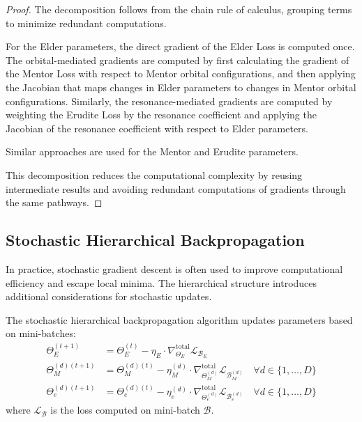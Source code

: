 \begin{proof}
The decomposition follows from the chain rule of calculus, grouping terms to minimize redundant computations.

For the Elder parameters, the direct gradient of the Elder Loss is computed once. The orbital-mediated gradients are computed by first calculating the gradient of the Mentor Loss with respect to Mentor orbital configurations, and then applying the Jacobian that maps changes in Elder parameters to changes in Mentor orbital configurations. Similarly, the resonance-mediated gradients are computed by weighting the Erudite Loss by the resonance coefficient and applying the Jacobian of the resonance coefficient with respect to Elder parameters.

Similar approaches are used for the Mentor and Erudite parameters.

This decomposition reduces the computational complexity by reusing intermediate results and avoiding redundant computations of gradients through the same pathways.
\end{proof}

\subsection{Stochastic Hierarchical Backpropagation}

In practice, stochastic gradient descent is often used to improve computational efficiency and escape local minima. The hierarchical structure introduces additional considerations for stochastic updates.

\begin{definition}
The stochastic hierarchical backpropagation algorithm updates parameters based on mini-batches:
\begin{align}
\Theta_E^{(t+1)} &= \Theta_E^{(t)} - \eta_E \cdot \nabla_{\Theta_E}^{\text{total}} \mathcal{L}_{\mathcal{B}_E} \\
\Theta_M^{(d)(t+1)} &= \Theta_M^{(d)(t)} - \eta_M^{(d)} \cdot \nabla_{\Theta_M^{(d)}}^{\text{total}} \mathcal{L}_{\mathcal{B}_M^{(d)}} \quad \forall d \in \{1, \ldots, D\} \\
\Theta_e^{(d)(t+1)} &= \Theta_e^{(d)(t)} - \eta_e^{(d)} \cdot \nabla_{\Theta_e^{(d)}}^{\text{total}} \mathcal{L}_{\mathcal{B}_e^{(d)}} \quad \forall d \in \{1, \ldots, D\}
\end{align}
where $\mathcal{L}_{\mathcal{B}}$ is the loss computed on mini-batch $\mathcal{B}$.
\end{definition}

